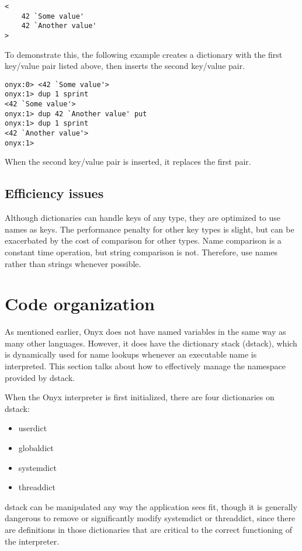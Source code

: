 \begin{verbatim}
<
    42 `Some value'
    42 `Another value'
>
\end{verbatim}

To demonstrate this, the following example creates a dictionary with the first
key/value pair listed above, then inserts the second key/value pair.

\begin{verbatim}
onyx:0> <42 `Some value'>
onyx:1> dup 1 sprint
<42 `Some value'>
onyx:1> dup 42 `Another value' put
onyx:1> dup 1 sprint
<42 `Another value'>
onyx:1>
\end{verbatim}

When the second key/value pair is inserted, it replaces the first pair.

\subsection{Efficiency issues}

Although dictionaries can handle keys of any type, they are optimized to use
names as keys.  The performance penalty for other key types is slight, but can
be exacerbated by the cost of comparison for other types.  Name comparison is a
constant time operation, but string comparison is not.  Therefore, use names
rather than strings whenever possible.

\section{Code organization}

As mentioned earlier, Onyx does not have named variables in the same way as many
other languages.  However, it does have the dictionary stack (dstack), which is
dynamically used for name lookups whenever an executable name is interpreted.
This section talks about how to effectively manage the namespace provided by
dstack.

When the Onyx interpreter is first initialized, there are four dictionaries on
dstack:

\begin{itemize}
\item{userdict}
\item{globaldict}
\item{systemdict}
\item{threaddict}
\end{itemize}

dstack can be manipulated any way the application sees fit, though it is
generally dangerous to remove or significantly modify systemdict or threaddict,
since there are definitions in those dictionaries that are critical to the
correct functioning of the interpreter.

